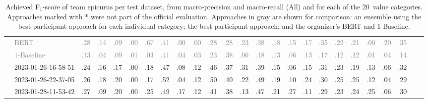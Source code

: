 \begin{table*}
\begin{tabular}{@{}ll@{\hspace{10pt}}c@{\hspace{5pt}}cccccccccccccccccccccc@{}}
& \textcolor{gray}{BERT} & \textcolor{gray}{.28} & \textcolor{gray}{.14} & \textcolor{gray}{.09} & \textcolor{gray}{.00} & \textcolor{gray}{.67} & \textcolor{gray}{.41} & \textcolor{gray}{.00} & \textcolor{gray}{.00} & \textcolor{gray}{.28} & \textcolor{gray}{.28} & \textcolor{gray}{.23} & \textcolor{gray}{.38} & \textcolor{gray}{.18} & \textcolor{gray}{.15} & \textcolor{gray}{.17} & \textcolor{gray}{.35} & \textcolor{gray}{.22} & \textcolor{gray}{.21} & \textcolor{gray}{.00} & \textcolor{gray}{.20} & \textcolor{gray}{.35} \\
& \textcolor{gray}{1-Baseline} & \textcolor{gray}{.13} & \textcolor{gray}{.04} & \textcolor{gray}{.09} & \textcolor{gray}{.01} & \textcolor{gray}{.03} & \textcolor{gray}{.41} & \textcolor{gray}{.04} & \textcolor{gray}{.03} & \textcolor{gray}{.23} & \textcolor{gray}{.38} & \textcolor{gray}{.06} & \textcolor{gray}{.18} & \textcolor{gray}{.13} & \textcolor{gray}{.06} & \textcolor{gray}{.13} & \textcolor{gray}{.17} & \textcolor{gray}{.12} & \textcolor{gray}{.12} & \textcolor{gray}{.01} & \textcolor{gray}{.04} & \textcolor{gray}{.14} \\
& 2023-01-26-16-58-51 & .24 & .16 & .17 & .00 & .18 & .47 & .08 & .12 & .46 & .37 & .31 & .39 & .15 & .06 & .15 & .31 & .23 & .19 & .13 & .06 & .32 \\
& 2023-01-26-22-37-05 & .26 & .18 & .20 & .00 & .17 & .52 & .04 & .12 & .50 & .40 & .22 & .49 & .19 & .10 & .24 & .30 & .25 & .25 & .12 & .04 & .29 \\
& 2023-01-28-11-53-42 & .27 & .09 & .20 & .00 & .25 & .49 & .17 & .12 & .41 & .38 & .13 & .47 & .21 & .27 & .11 & .29 & .23 & .24 & .25 & .06 & .30 \\
\bottomrule
\end{tabular}
\caption{Achieved F$_1$-score of team epicurus per test dataset, from macro-precision and macro-recall (All) and for each of the 20~value categories. Approaches marked with * were not part of the official evaluation. Approaches in gray are shown for comparison: an ensemble using the best participant approach for each individual category; the best participant approach; and the organizer's BERT and 1-Baseline.}
\label{table-results}
\end{table*}

